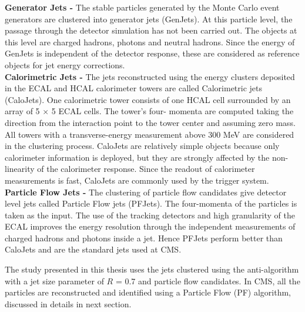{\bf Generator Jets -} The stable particles generated by the Monte Carlo event generators are clustered into generator jets (GenJets). At this particle level, the passage through the detector simulation has not been carried out. The objects at this level are charged hadrons, photons and neutral hadrons. Since the energy of GenJets is independent of the detector response, these are considered as reference objects for jet energy corrections. \\ \newline
{\bf Calorimetric Jets -} The jets reconstructed using the energy clusters deposited in the ECAL and HCAL calorimeter towers are called Calorimetric jets (CaloJets). One calorimetric tower consists of one HCAL cell surrounded by an array of 5 $\times$ 5 ECAL cells. The tower’s four- momenta are computed taking the direction from the interaction point to the tower center and assuming zero mass. All towers with a transverse-energy measurement above 300 MeV are considered in the clustering process. CaloJets are relatively simple objects because only calorimeter information is deployed, but they are strongly affected by the non-linearity of the calorimeter response. Since the readout of calorimeter measurements is fast, CaloJets are commonly used by the trigger system. \\ \newline
{\bf Particle Flow Jets -} The clustering of particle flow candidates give detector level jets called Particle Flow jets (PFJets). The four-momenta of the particles is taken as the input. The use of the tracking detectors and high granularity of the ECAL improves the energy resolution through the independent measurements of charged hadrons and photons inside a jet. Hence PFJets perform better than CaloJets and are the standard jets used at CMS.

The study presented in this thesis uses the jets clustered using the anti-\kt algorithm with a jet size parameter of $R$ = 0.7 and particle flow candidates. In CMS, all the particles are reconstructed and identified using a Particle Flow (PF) algorithm, discussed in details in next section.

